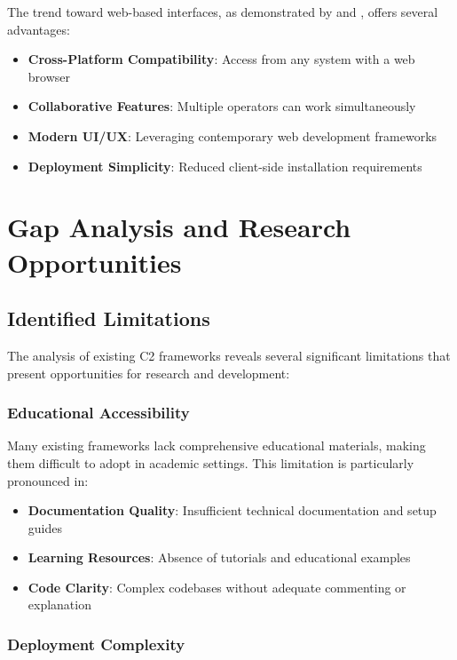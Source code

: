The trend toward web-based interfaces, as demonstrated by  and , offers several advantages:

\begin{itemize}
\item \textbf{Cross-Platform Compatibility}: Access from any system with a web browser
\item \textbf{Collaborative Features}: Multiple operators can work simultaneously
\item \textbf{Modern UI/UX}: Leveraging contemporary web development frameworks
\item \textbf{Deployment Simplicity}: Reduced client-side installation requirements
\end{itemize}

\section{Gap Analysis and Research Opportunities}
\label{sec:gap_analysis}

\subsection{Identified Limitations}
\label{subsec:identified_limitations}

The analysis of existing C2 frameworks reveals several significant limitations that present opportunities for research and development:

\subsubsection{Educational Accessibility}

Many existing frameworks lack comprehensive educational materials, making them difficult to adopt in academic settings. This limitation is particularly pronounced in:

\begin{itemize}
\item \textbf{Documentation Quality}: Insufficient technical documentation and setup guides
\item \textbf{Learning Resources}: Absence of tutorials and educational examples
\item \textbf{Code Clarity}: Complex codebases without adequate commenting or explanation
\end{itemize}

\subsubsection{Deployment Complexity}

